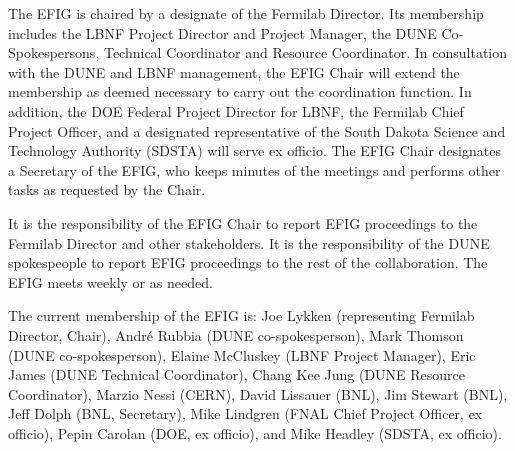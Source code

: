 The EFIG is chaired by a designate of the Fermilab Director.
Its membership includes the LBNF Project Director and Project Manager,
the DUNE Co-Spokespersons, Technical Coordinator and Resource Coordinator.
In consultation with the DUNE and LBNF management, the EFIG Chair will
extend the membership as deemed necessary to carry out the coordination
function. In addition, the DOE Federal Project Director for LBNF,
the Fermilab Chief Project Officer, and a designated representative
of the South Dakota Science and Technology Authority (SDSTA) will
serve ex officio. The EFIG Chair designates a Secretary of the EFIG,
who keeps minutes of the meetings and performs other tasks as
requested by the Chair.

It is the responsibility of the EFIG Chair to report EFIG proceedings
to the Fermilab Director and other stakeholders. It is the responsibility
of the DUNE spokespeople to report EFIG proceedings to the rest of
the collaboration. The EFIG meets weekly or as needed.

The current membership of the EFIG is:
Joe Lykken (representing Fermilab Director, Chair),
André Rubbia (DUNE co-spokesperson),
Mark Thomson (DUNE co-spokesperson),
Elaine McCluskey (LBNF Project Manager),
Eric James (DUNE Technical Coordinator),
Chang Kee Jung (DUNE Resource Coordinator),
Marzio Nessi (CERN),
David Lissauer (BNL),
Jim Stewart (BNL),
Jeff Dolph (BNL, Secretary),
Mike Lindgren (FNAL Chief Project Officer, ex officio),
Pepin Carolan (DOE, ex officio), and 
Mike Headley (SDSTA, ex officio).
